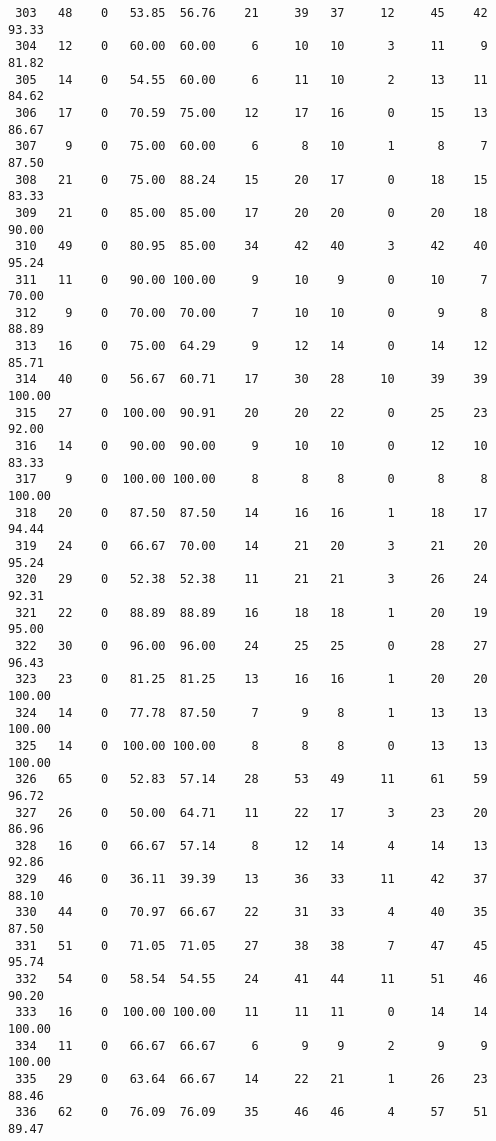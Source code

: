 \begin{verbatim}
 303   48    0   53.85  56.76    21     39   37     12     45    42    93.33
 304   12    0   60.00  60.00     6     10   10      3     11     9    81.82
 305   14    0   54.55  60.00     6     11   10      2     13    11    84.62
 306   17    0   70.59  75.00    12     17   16      0     15    13    86.67
 307    9    0   75.00  60.00     6      8   10      1      8     7    87.50
 308   21    0   75.00  88.24    15     20   17      0     18    15    83.33
 309   21    0   85.00  85.00    17     20   20      0     20    18    90.00
 310   49    0   80.95  85.00    34     42   40      3     42    40    95.24
 311   11    0   90.00 100.00     9     10    9      0     10     7    70.00
 312    9    0   70.00  70.00     7     10   10      0      9     8    88.89
 313   16    0   75.00  64.29     9     12   14      0     14    12    85.71
 314   40    0   56.67  60.71    17     30   28     10     39    39   100.00
 315   27    0  100.00  90.91    20     20   22      0     25    23    92.00
 316   14    0   90.00  90.00     9     10   10      0     12    10    83.33
 317    9    0  100.00 100.00     8      8    8      0      8     8   100.00
 318   20    0   87.50  87.50    14     16   16      1     18    17    94.44
 319   24    0   66.67  70.00    14     21   20      3     21    20    95.24
 320   29    0   52.38  52.38    11     21   21      3     26    24    92.31
 321   22    0   88.89  88.89    16     18   18      1     20    19    95.00
 322   30    0   96.00  96.00    24     25   25      0     28    27    96.43
 323   23    0   81.25  81.25    13     16   16      1     20    20   100.00
 324   14    0   77.78  87.50     7      9    8      1     13    13   100.00
 325   14    0  100.00 100.00     8      8    8      0     13    13   100.00
 326   65    0   52.83  57.14    28     53   49     11     61    59    96.72
 327   26    0   50.00  64.71    11     22   17      3     23    20    86.96
 328   16    0   66.67  57.14     8     12   14      4     14    13    92.86
 329   46    0   36.11  39.39    13     36   33     11     42    37    88.10
 330   44    0   70.97  66.67    22     31   33      4     40    35    87.50
 331   51    0   71.05  71.05    27     38   38      7     47    45    95.74
 332   54    0   58.54  54.55    24     41   44     11     51    46    90.20
 333   16    0  100.00 100.00    11     11   11      0     14    14   100.00
 334   11    0   66.67  66.67     6      9    9      2      9     9   100.00
 335   29    0   63.64  66.67    14     22   21      1     26    23    88.46
 336   62    0   76.09  76.09    35     46   46      4     57    51    89.47

\end{verbatim}
